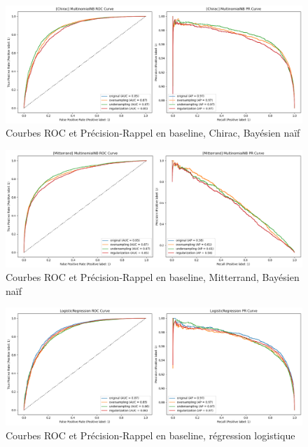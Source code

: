 \documentclass{article}
\begin{document}
\begin{figure}[H]
    \centering
    \includegraphics[width=\textwidth]{./src/locuteur/roc_curve_MultinomialNB_Chirac.png} 
    \caption{Courbes ROC et Précision-Rappel en baseline, Chirac, Bayésien naïf}
    \label{roc_curve_MultinomialNB_Chirac}
\end{figure}

\begin{figure}[H]
    \centering
    \includegraphics[width=\textwidth]{./src/locuteur/roc_curve_MultinomialNB_Mitterrand.png} 
    \caption{Courbes ROC et Précision-Rappel en baseline, Mitterrand, Bayésien naïf}
    \label{roc_curve_MultinomialNB_Mitterrand}
\end{figure}

\begin{figure}[H]
    \centering
    \includegraphics[width=\textwidth]{./src/locuteur/roc_curve_LogisticRegression.png} 
    \caption{Courbes ROC et Précision-Rappel en baseline, régression logistique}
    \label{roc_curve_LogisticRegression}
\end{figure}
\end{document}
